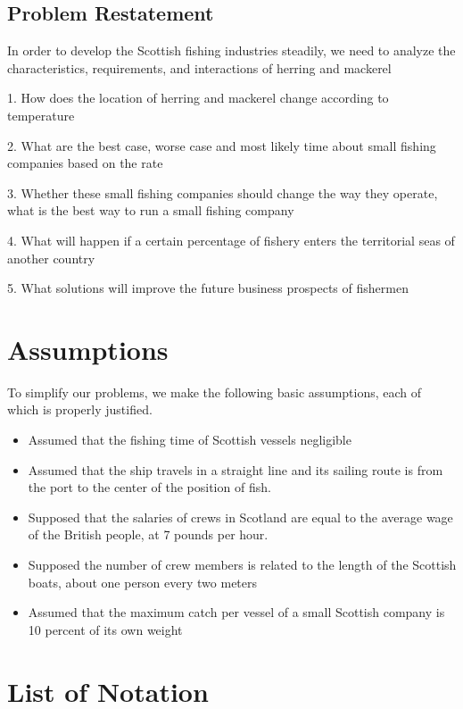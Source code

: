 \documentclass{mcmthesis}
\begin{document}
\subsection{Problem Restatement}
In order to develop the Scottish fishing industries steadily,   we need to analyze the characteristics, requirements, and interactions of herring and mackerel

1.    How does the location of herring and mackerel change according to temperature

2.    What are the best case, worse case and most likely time about  small fishing companies  based on the rate 


3.    Whether these small fishing companies should change the way they operate, what is the best way to run a small fishing company
 
4.    What will happen if a certain percentage of fishery enters the territorial seas of another country

5.    What solutions will improve the future business prospects of fishermen

\section{Assumptions}
To simplify our problems, we make the following basic assumptions, each of which is properly justified.
\begin{itemize}
\item 
Assumed that the fishing time of Scottish vessels negligible
\item 
Assumed that the ship travels in a straight line and its sailing route is from the port to the center of the position of fish.
\item 
Supposed that the salaries of crews in Scotland are equal to the average wage of the British people, at 7 pounds per hour.
\item 
Supposed the number of crew members is related to the length of the Scottish boats, about one person every two meters
\item 
Assumed that the maximum catch per vessel of a small Scottish company is 10 percent of its own weight

\end{itemize}

\section{List of Notation}
\end{document}
